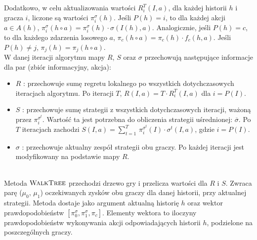 \documentclass[magisterska]{pracamgr}
\begin{document}
\noindent
Dodatkowo, w celu aktualizowania wartości $R_i^T(I, a)$, dla każdej historii $h$ i gracza $i$, liczone są wartości $\pi_i^{\sigma}(h)$.
Jeśli $P(h) = i$, to dla każdej akcji $a \in A(h)$, $\pi_i^{\sigma}(h \circ a) = \pi_i^{\sigma}(h) \cdot \sigma(I(h), a)$.
Analogicznie, jeśli $P(h) = c$, to dla każdego zdarzenia losowego $a$, $\pi_c(h \circ a) = \pi_c(h) \cdot f_c(h, a)$.
Jeśli $P(h) \neq j$, $\pi_j(h) = \pi_j(h \circ a)$. \\

\noindent
W danej iteracji algorytmu mapy $R$, $S$ oraz $\sigma$ przechowują następujące informacje
dla par (zbiór informacyjny, akcja):
\begin{itemize}
\item $R$ : przechowuje sumę regretu lokalnego po wszystkich dotychczasowych iteracjach algorytmu. Po iteracji $T$, $R(I, a) = T \cdot R_i^T(I, a)$
        dla $i = P(I)$.
\item $S$ : przechowuje sumę strategii z wszystkich dotychczasowych iteracji, ważoną przez $\pi_i^{\sigma^t}$. Wartość ta jest
            potrzebna do obliczenia strategii uśrednionej: $\overline{\sigma}$. Po $T$ iteracjach zachodzi
            $S(I, a) = \sum\limits_{t=1}^T \, \pi_i^{\sigma^t}(I) \cdot \sigma^t(I, a)$, gdzie $i = P(I)$.
\item $\sigma$ : przechowuje aktualny zespół strategii obu graczy. Po każdej iteracji jest modyfikowany na podstawie mapy $R$.
\end{itemize}

$\,$ \\

\noindent
Metoda $\Call{WalkTree}{}$ przechodzi drzewo gry i przelicza wartości dla $R$ i $S$. Zwraca parę
($\mu_0$, $\mu_1$) oczekiwanych zysków obu graczy dla danej historii, przy aktualnej strategii. Metoda
dostaje jako argument aktualną historię $h$ oraz wektor prawdopodobieństw $[\pi_0^{\sigma}, \pi_1^{\sigma}, \pi_c ]$.
Elementy wektora to iloczyny prawdopodobieństw wykonywania akcji odpowiadających historii $h$,
podzielone na poszczególnych graczy.\\\\
\end{document}
